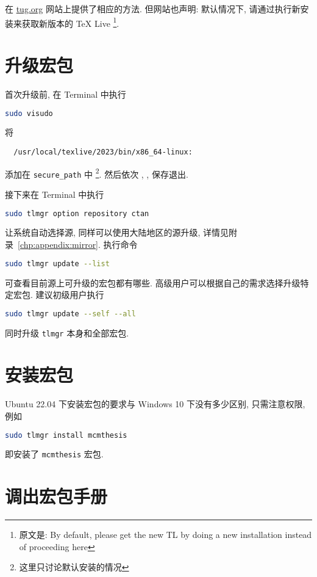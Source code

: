 在 \href{https://www.tug.org/texlive/upgrade.html}{tug.org}
网站上提供了相应的方法.
但网站也声明:
默认情况下,
请通过执行新安装来获取新版本的 \TeX{} Live%
\footnote{原文是: By default,
please get the new TL by doing a new installation instead of proceeding here}.

\section{升级宏包}\label{sec:ubuntu:update}

首次升级前,
在 \textsf{Terminal} 中执行
\begin{lstlisting}[language = bash]
  sudo visudo
\end{lstlisting}
将
\begin{lstlisting}
  /usr/local/texlive/2023/bin/x86_64-linux:
\end{lstlisting}
添加在 \texttt{secure\_path} 中%
\footnote{这里只讨论默认安装的情况}.
然后依次 , , \keys{\enter} 保存退出.

接下来在 \textsf{Terminal} 中执行
\begin{lstlisting}[language = bash]
  sudo tlmgr option repository ctan
\end{lstlisting}
让系统自动选择源,
同样可以使用大陆地区的源升级,
详情见附录~\ref{chp:appendix:mirror}.
执行命令
\begin{lstlisting}[language = bash]
  sudo tlmgr update --list
\end{lstlisting}
可查看目前源上可升级的宏包都有哪些. 
高级用户可以根据自己的需求选择升级特定宏包.
建议初级用户执行
\begin{lstlisting}[language = bash]
  sudo tlmgr update --self --all
\end{lstlisting}
同时升级 \texttt{tlmgr} 本身和全部宏包. 

\section{安装宏包}\label{sec:ubuntu:installpackage}

Ubuntu 22.04 下安装宏包的要求与 Windows 10 下没有多少区别, 只需注意权限, 例如
\begin{lstlisting}[language = bash]
  sudo tlmgr install mcmthesis
\end{lstlisting}
即安装了 \texttt{mcmthesis} 宏包.

\section{调出宏包手册}\label{sec:ubuntu:texdoc}

